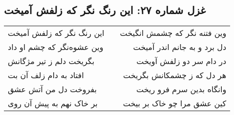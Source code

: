 \begin{center}
\section*{غزل شماره ۲۷: این رنگ نگر که زلفش آمیخت}
\label{sec:027}
\begin{longtable}{l p{0.5cm} r}
این رنگ نگر که زلفش آمیخت
&&
وین فتنه نگر که چشمش انگیخت
\\
وین عشوه‌نگر که چشم او داد
&&
دل برد و به جانم اندر آمیخت
\\
بگریخت دلم ز تیر مژگانش
&&
در دام سر دو زلفش آویخت
\\
افتاد به دام زلف آن بت
&&
هر دل که ز چشمکانش بگریخت
\\
بفروخت دل من آتش عشق
&&
وانگاه بدین سرم فرو ریخت
\\
بر خاک نهم به پیش آن روی
&&
کین عشق مرا چو خاک بر بیخت
\\
\end{longtable}
\end{center}

